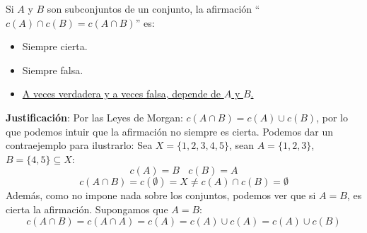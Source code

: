 \documentclass[12pt]{article}
\newcounter{ejercicio}[section] %
\newcounter{ejercicio}
\begin{document}
    \begin{ejercicio}
        Si $A$ y $B$ son subconjuntos de un conjunto, la afirmación \newline ``$c(A) \cap c(B) = c(A \cap B)$'' es:
        \begin{itemize}
            \item Siempre cierta.
            \item Siempre falsa.
            \item \underline{A veces verdadera y a veces falsa, depende de $A$ y $B$.}
        \end{itemize}

        \noindent
        \textbf{Justificación}:
        Por las Leyes de Morgan: $c(A \cap B) = c(A) \cup c(B)$, por lo que podemos intuir que la afirmación no siempre es cierta. Podemos dar un contraejemplo para ilustrarlo:\newline
        Sea $X = \{1,2,3,4,5\}$, sean $A = \{1,2,3\}$, $B = \{4,5\} \subseteq X$:
        $$c(A) = B~~~~c(B) = A$$
        $$c(A \cap B) = c(\emptyset) = X \neq c(A) \cap c(B) = \emptyset$$
        Además, como no impone nada sobre los conjuntos, podemos ver que si $A = B$, es cierta la afirmación. Supongamos que $A = B$:
        $$c(A \cap B) = c(A \cap A) = c(A) = c(A) \cup c(A) = c(A) \cup c(B)$$

    \end{ejercicio}
\end{document}
